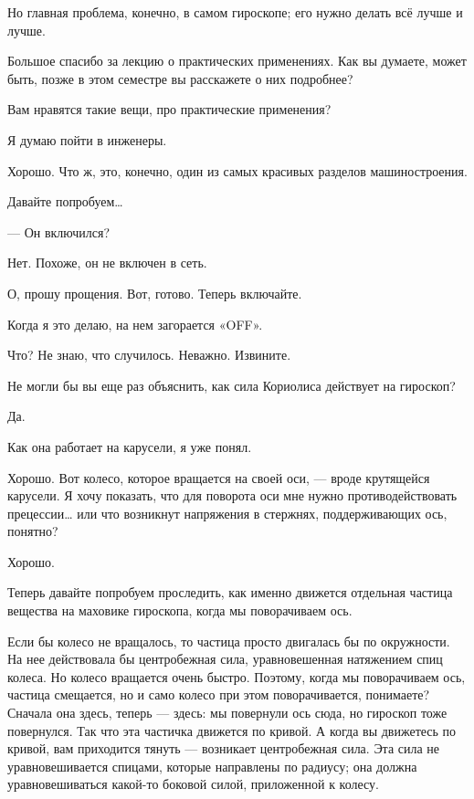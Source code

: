 \documentclass[11pt,oneside]{article}
\begin{document}
Но главная проблема, конечно, в самом гироскопе; его нужно делать всё лучше и лучше.\par

Большое спасибо за лекцию о практических применениях. Как вы думаете, может быть, позже в этом семестре вы расскажете о них подробнее?\par

Вам нравятся такие вещи, про практические применения?\par

Я думаю пойти в инженеры.\par

Хорошо. Что ж, это, конечно, один из самых красивых разделов машиностроения.\par

Давайте попробуем\ldots{}\par

--- Он включился?\par

Нет. Похоже, он не включен в сеть.\par

О, прошу прощения. Вот, готово. Теперь включайте.\par

Когда я это делаю, на нем загорается «OFF».\par

Что? Не знаю, что случилось. Неважно. Извините.\par

Не могли бы вы еще раз объяснить, как сила Кориолиса действует на гироскоп?\par

Да.\par

Как она работает на карусели, я уже понял.\par

Хорошо. Вот колесо, которое вращается на своей оси, --- вроде крутящейся карусели. Я хочу показать, что для поворота оси мне нужно противодействовать прецессии\ldots{} или что возникнут напряжения в стержнях, поддерживающих ось, понятно?\par

Хорошо.\par

Теперь давайте попробуем проследить, как именно движется отдельная частица вещества на маховике гироскопа, когда мы поворачиваем ось.\par

Если бы колесо не вращалось, то частица просто двигалась бы по окружности. На нее действовала бы центробежная сила, уравновешенная натяжением спиц колеса. Но колесо вращается очень быстро. Поэтому, когда мы поворачиваем ось, частица смещается, но и само колесо при этом поворачивается, понимаете? Сначала она здесь, теперь --- здесь: мы повернули ось сюда, но гироскоп тоже повернулся. Так что эта частичка движется по кривой. А когда вы движетесь по кривой, вам приходится тянуть --- возникает центробежная сила. Эта сила не уравновешивается спицами, которые направлены по радиусу; она должна уравновешиваться какой-то боковой силой, приложенной к колесу.\par
\end{document}
